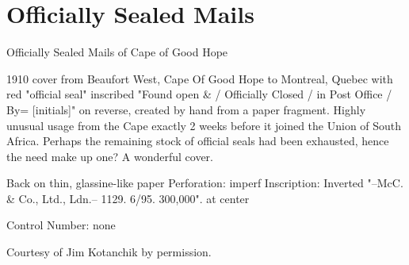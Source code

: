 \section{Officially Sealed Mails}


 
 
Officially Sealed Mails of Cape of Good Hope

1910 cover from Beaufort West, Cape Of Good Hope to Montreal, 
Quebec with red "official seal" inscribed "Found open \& / 
Officially Closed / in Post Office / By= [initials]" on reverse, 
created by hand from a paper fragment. Highly unusual usage 
from the Cape exactly 2 weeks before it joined the 
Union of South Africa. Perhaps the remaining stock of 
official seals had been exhausted, hence the need make up one? 
A wonderful cover.

Back on thin, glassine-like paper Perforation: 
imperf Inscription: Inverted "--McC. \& Co., Ltd., 
Ldn.-- 1129. 6/95. 300,000". at center

Control Number: none

Courtesy of Jim Kotanchik by permission.

 
	 
 
 
 
 
 
 

 

 

 

 

 

 

 

 

                